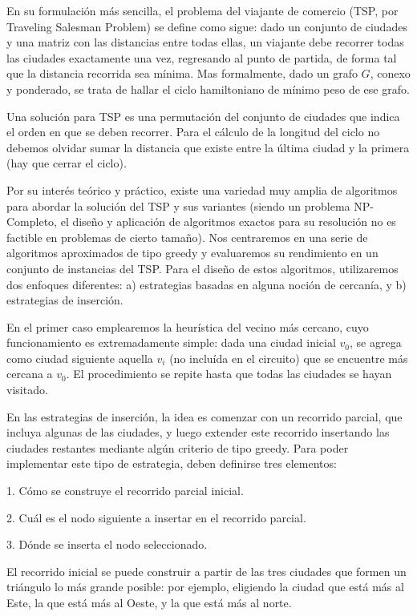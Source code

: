 En su formulación más sencilla, el problema del viajante de comercio (TSP, por Traveling
Salesman Problem) se define como sigue: dado un conjunto de ciudades y una matriz con
las distancias entre todas ellas, un viajante debe recorrer todas las ciudades exactamente una
vez, regresando al punto de partida, de forma tal que la distancia recorrida sea mínima. 
Mas formalmente, dado un grafo $G$, conexo y ponderado, se trata de hallar el ciclo hamiltoniano de
mínimo peso de ese grafo.

Una solución para TSP es una permutación del conjunto de ciudades que indica el orden
en que se deben recorrer. Para el cálculo de la longitud del ciclo no debemos olvidar sumar la
distancia que existe entre la última ciudad y la primera (hay que cerrar el ciclo).

Por su interés teórico y práctico, existe una variedad muy amplia de algoritmos para abordar
la solución del TSP y sus variantes (siendo un problema NP-Completo, el diseño y aplicación
de algoritmos exactos para su resolución no es factible en problemas de cierto tamaño). Nos
centraremos en una serie de algoritmos aproximados de tipo greedy y evaluaremos su rendimiento
en un conjunto de instancias del TSP. Para el diseño de estos algoritmos, utilizaremos
dos enfoques diferentes: a) estrategias basadas en alguna noción de cercanía, y b) estrategias
de inserción.

En el primer caso emplearemos la heurística del vecino más cercano, cuyo funcionamiento
es extremadamente simple: dada una ciudad inicial $v_0$, se agrega como ciudad siguiente aquella
$v_i$ (no incluída en el circuito) que se encuentre más cercana a $v_0$. El procedimiento se repite
hasta que todas las ciudades se hayan visitado.

En las estrategias de inserción, la idea es comenzar con un recorrido parcial, que incluya
algunas de las ciudades, y luego extender este recorrido insertando las ciudades restantes mediante
algún criterio de tipo greedy. Para poder implementar este tipo de estrategia, deben
definirse tres elementos:

1. Cómo se construye el recorrido parcial inicial.

2. Cuál es el nodo siguiente a insertar en el recorrido parcial.

3. Dónde se inserta el nodo seleccionado.

El recorrido inicial se puede construir a partir de las tres ciudades que formen un triángulo
lo más grande posible: por ejemplo, eligiendo la ciudad que está más al Este, la que está más al
Oeste, y la que está más al norte.

